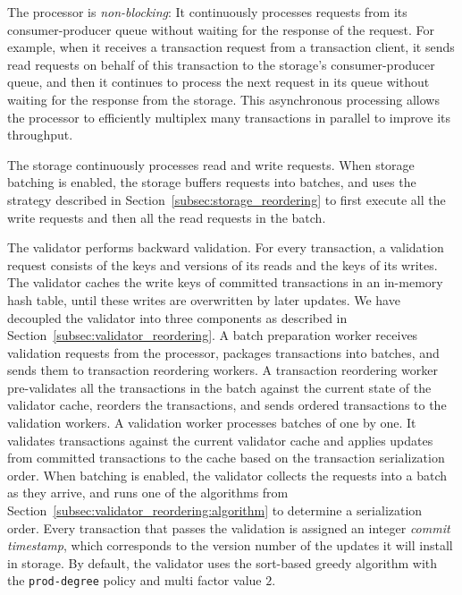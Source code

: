 The processor is \emph{non-blocking}: It continuously processes requests from its consumer-producer queue without waiting for the response of the request. For example, when it receives a transaction request from a transaction client, it sends read requests on behalf of this transaction to the storage's consumer-producer queue, and then it continues to process the next request in its queue without waiting for the response from the storage. This asynchronous processing allows the processor to efficiently multiplex many transactions in parallel to improve its throughput.

The storage continuously processes read and write requests. When storage batching is enabled, the storage buffers requests into batches, and uses the strategy described in Section~\ref{subsec:storage_reordering} to first execute all the write requests and then all the read requests in the batch.

The validator performs backward validation. For every transaction, a validation request consists of the keys and versions of its reads and the keys of its writes. The validator caches the write keys of committed transactions in an in-memory hash table, until these writes are overwritten by later updates.
We have decoupled the validator into three components as described in Section~\ref{subsec:validator_reordering}. A batch preparation worker receives validation requests from the processor, packages transactions into batches, and sends them to transaction reordering workers. A transaction reordering worker pre-validates all the transactions in the batch against the current state of the validator cache, reorders the transactions, and sends ordered transactions to the validation workers. A validation worker processes batches of  one by one. It validates transactions against the current validator cache and applies updates from committed transactions to the cache based on the transaction serialization order.  When batching is enabled, the validator collects the requests into a batch as they arrive, and runs one of the algorithms from Section~\ref{subsec:validator_reordering:algorithm} to determine a serialization order. Every transaction that passes the validation is assigned an integer \emph{commit timestamp}, which corresponds to the version number of the updates it will install in storage. 
By default, the validator uses the sort-based greedy algorithm with the \texttt{prod-degree} policy and multi factor  value $2$.


